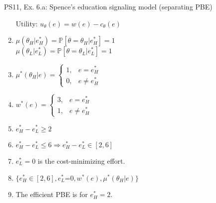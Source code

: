 \begin{frame}{PS11, Ex. 6.a: Spence’s education signaling model (separating PBE)}
\begin{multicols}{2}
\begin{enumerate}
        \item[Utility:] \vspace{-4pt}$u_\theta(e)=w(e)-c_\theta(e)$
        \item \vspace{-2pt}$\mu\left(\theta_H|e_H^*\right)=
               \mathbb{P}\left[\theta=\theta_H|e_H^*\right]=1$\\
              $\mu\left(\theta_L|e_L^*\right)=
               \mathbb{P}\left[\theta=\theta_L|e_L^*\right]=1$
        \item \vspace{-2pt}$\mu^*(\theta_H|e)=\left\{\begin{array}{ll}
                  1, & e = e_H^* \\
                  0, & e \neq e_H^*
               \end{array}\right.$
        \item \vspace{-2pt}$w^*(e)=\left\{\begin{array}{ll}
                  3, & e = e_H^* \\
                  1, & e \neq e_H^*
               \end{array}\right.$
        \item \vspace{-1pt}$e_H^*-e_L^*\geq2$
        \item \vspace{-1pt}$e_H^*-e_L^*\leq6\Rightarrow e_H^*-e_L^*\in[2,6]$
        \item \vspace{-1pt}$e_L^*=0$ is the cost-minimizing effort.
        \item \vspace{-1pt}$\{e_H^*\in[2,6],e_L^*$=$0,w^*(e),\mu^*(\theta_H|e)\}$
        \item \vspace{-1pt}The efficient PBE is for $e_H^*=2$.
      \end{enumerate}
    \end{multicols}
    \vfill\null
\end{frame}

